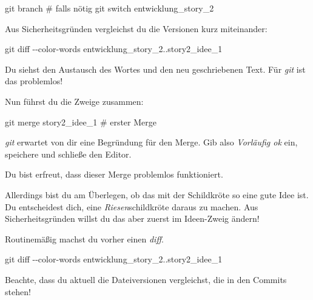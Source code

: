 \documentclass[
  letterpaper,
  DIV=11]{scrreprt}
\newenvironment{Shaded}{\begin{snugshade}}{\end{snugshade}}
\newcommand{\AttributeTok}[1]{\textcolor[rgb]{0.40,0.45,0.13}{#1}}
\newcommand{\CommentTok}[1]{\textcolor[rgb]{0.37,0.37,0.37}{#1}}
\newcommand{\FunctionTok}[1]{\textcolor[rgb]{0.28,0.35,0.67}{#1}}
\newcommand{\NormalTok}[1]{\textcolor[rgb]{0.00,0.23,0.31}{#1}}
\newcommand{\git}{\textit{git}\xspace}
\begin{document}
\begin{Shaded}
\begin{Highlighting}[]
\FunctionTok{git}\NormalTok{ branch}
\CommentTok{\# falls nötig}
\FunctionTok{git}\NormalTok{ switch entwicklung\_story\_2}
\end{Highlighting}
\end{Shaded}

Aus Sicherheitsgründen vergleichst du die Versionen kurz miteinander:

\begin{Shaded}
\begin{Highlighting}[]
\FunctionTok{git}\NormalTok{ diff }\AttributeTok{{-}{-}color{-}words}\NormalTok{ entwicklung\_story\_2..story2\_idee\_1}
\end{Highlighting}
\end{Shaded}

Du siehst den Austausch des Wortes und den neu geschriebenen Text. Für
\git ist das problemlos!

Nun führst du die Zweige zusammen:

\begin{Shaded}
\begin{Highlighting}[]
\FunctionTok{git}\NormalTok{ merge story2\_idee\_1  }\CommentTok{\# erster Merge}
\end{Highlighting}
\end{Shaded}

\git erwartet von dir eine Begründung für den Merge. Gib also
\emph{Vorläufig ok} ein, speichere und schließe den Editor.

Du bist erfreut, dass dieser Merge problemlos funktioniert.

Allerdings bist du am Überlegen, ob das mit der Schildkröte so eine gute
Idee ist. Du entscheidest dich, eine \emph{Riesen}schildkröte daraus zu
machen. Aus Sicherheitsgründen willst du das aber zuerst im Ideen-Zweig
ändern!

Routinemäßig machst du vorher einen \emph{diff}.

\begin{Shaded}
\begin{Highlighting}[]
\FunctionTok{git}\NormalTok{ diff }\AttributeTok{{-}{-}color{-}words}\NormalTok{ entwicklung\_story\_2..story2\_idee\_1}
\end{Highlighting}
\end{Shaded}

Beachte, dass du aktuell die Dateiversionen vergleichst, die in den
Commits stehen!
\end{document}
